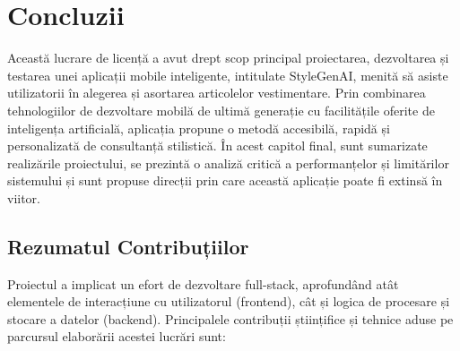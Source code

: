 \chapter{Concluzii}
\label{cap:concluzii}

Această lucrare de licență a avut drept scop principal proiectarea, dezvoltarea și testarea unei aplicații mobile inteligente, intitulate StyleGenAI, menită să asiste utilizatorii în alegerea și asortarea articolelor vestimentare. Prin combinarea tehnologiilor de dezvoltare mobilă de ultimă generație cu facilitățile oferite de inteligența artificială, aplicația propune o metodă accesibilă, rapidă și personalizată de consultanță stilistică. În acest capitol final, sunt sumarizate realizările proiectului, se prezintă o analiză critică a performanțelor și limitărilor sistemului și sunt propuse direcții prin care această aplicație poate fi extinsă în viitor.

\section{Rezumatul Contribuțiilor}

Proiectul a implicat un efort de dezvoltare full-stack, aprofundând atât elementele de interacțiune cu utilizatorul (frontend), cât și logica de procesare și stocare a datelor (backend). Principalele contribuții științifice și tehnice aduse pe parcursul elaborării acestei lucrări sunt:

